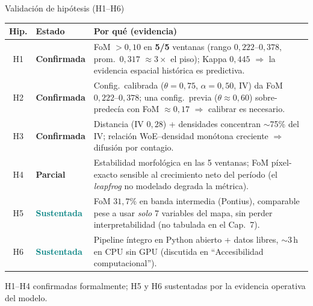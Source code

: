 \documentclass[aspectratio=169,11pt]{beamer}
\begin{document}
\begin{frame}{Validación de hipótesis (H1--H6)}
  \scriptsize
  \begin{block}{}
  \begin{tabularx}{\linewidth}{@{}cl>{\raggedright\arraybackslash}X@{}}
    \toprule
    \textbf{Hip.} & \textbf{Estado} & \textbf{Por qué (evidencia)} \\
    \midrule
    H1 & \textcolor{GreenOK}{\textbf{Confirmada}} & FoM $>0{,}10$ en \textbf{5/5} ventanas (rango $0{,}222$--$0{,}378$, prom.\ $0{,}317$ $\approx 3\times$ el piso); Kappa $0{,}445$ $\Rightarrow$ la evidencia espacial histórica es predictiva. \\
    H2 & \textcolor{GreenOK}{\textbf{Confirmada}} & Config.\ calibrada ($\theta{=}0{,}75$, $\alpha{=}0{,}50$, IV) da FoM $0{,}222$--$0{,}378$; una config.\ previa ($\theta{\approx}0{,}60$) sobre-predecía con FoM $\approx 0{,}17$ $\Rightarrow$ calibrar es necesario. \\
    H3 & \textcolor{GreenOK}{\textbf{Confirmada}} & Distancia (IV $0{,}28$) + densidades concentran $\sim$75\% del IV; relación WoE--densidad monótona creciente $\Rightarrow$ difusión por contagio. \\
    H4 & \textcolor{Amber}{\textbf{Parcial}} & Estabilidad morfológica en las 5 ventanas; FoM píxel-exacto sensible al crecimiento neto del período (el \emph{leapfrog} no modelado degrada la métrica). \\
    H5 & \textcolor{Teal}{\textbf{Sustentada}} & FoM $31{,}7\%$ en banda intermedia (Pontius), comparable pese a usar \emph{solo} 7 variables del mapa, sin perder interpretabilidad (no tabulada en el Cap.~7). \\
    H6 & \textcolor{Teal}{\textbf{Sustentada}} & Pipeline íntegro en Python abierto + datos libres, $\sim$3\,h en CPU sin GPU (discutida en ``Accesibilidad computacional''). \\
    \bottomrule
  \end{tabularx}
  \end{block}
  \centering\footnotesize H1--H4 confirmadas formalmente; H5 y H6 sustentadas por la evidencia operativa del modelo.
\end{frame}
\end{document}
